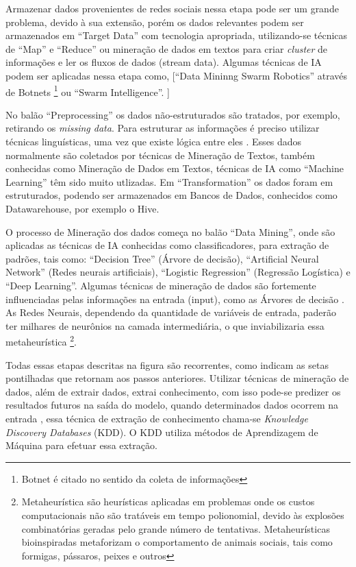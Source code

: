 Armazenar dados provenientes de redes sociais nessa etapa pode ser um grande problema, devido à sua extensão, porém os dados relevantes podem ser armazenados em ``Target Data'' 
com tecnologia apropriada, utilizando-se técnicas de ``Map'' e ``Reduce'' ou mineração de dados em textos para criar \textit{cluster} de informações e ler os fluxos de dados (stream data). 
Algumas técnicas de IA podem ser aplicadas nessa etapa como, [``Data Mininng Swarm Robotics'' através de Botnets \footnote{Botnet é citado no sentido da coleta de informações} ou ``Swarm Intelligence''. ]

No balão ``Preprocessing'' os dados não-estruturados são tratados, por exemplo, retirando os \textit{missing data}. 
Para estruturar as informações é preciso utilizar técnicas linguísticas, uma vez que existe lógica entre eles \cite{Aranha2006}.
Esses dados normalmente são coletados por técnicas de Mineração de Textos, também conhecidas como Mineração de Dados em Textos, técnicas de IA como ``Machine Learning'' 
têm sido muito utlizadas. Em ``Transformation'' os dados foram em estruturados, podendo ser armazenados em Bancos de Dados, conhecidos como Datawarehouse, por exemplo o Hive. 

O processo de Mineração dos dados começa no balão ``Data Mining'', onde são aplicadas as técnicas de IA conhecidas como classificadores, para extração de padrões, tais como: 
``Decision Tree'' (Árvore de decisão), ``Artificial Neural Network'' (Redes neurais artificiais), ``Logistic Regression'' (Regressão Logística) e ``Deep Learning''.
Algumas técnicas de mineração de dados são fortemente influenciadas pelas informações na entrada (input), como as Árvores de decisão \cite{DecisionTree}. 
As Redes Neurais, dependendo da quantidade de variáveis de entrada, paderão ter milhares de neurônios na camada intermediária, o que inviabilizaria essa metaheurística 
\footnote{Metaheurística são heurísticas aplicadas em problemas onde os custos computacionais não são tratáveis em tempo polionomial, devido às explosões combinatórias geradas
pelo grande número de tentativas. Metaheurísticas bioinspiradas metaforizam o comportamento de animais sociais, tais como formigas, pássaros, peixes e outros}.

Todas essas etapas descritas na figura são recorrentes, como indicam as setas pontilhadas que retornam aos passos anteriores.
Utilizar técnicas de mineração de dados, além de extrair dados, extrai conhecimento, com isso pode-se predizer os resultados futuros na saída do modelo, 
quando determinados dados ocorrem na entrada \cite{Amin2015a}, essa técnica de extração de conhecimento chama-se \textit{Knowledge Discovery Databases} (KDD).
O KDD utiliza métodos de Aprendizagem de Máquina para efetuar essa extração.

